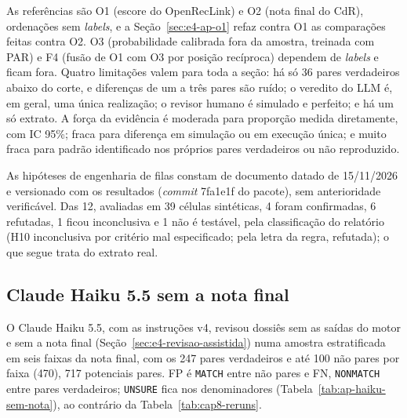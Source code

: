 As referências são O1 (escore do OpenRecLink) e O2 (nota final do CdR), ordenações sem \textit{labels}, e a Seção~\ref{sec:e4-ap-o1} refaz contra O1 as comparações feitas contra O2. O3 (probabilidade calibrada fora da amostra, treinada com PAR) e F4 (fusão de O1 com O3 por posição recíproca) dependem de \textit{labels} e ficam fora. Quatro limitações valem para toda a seção: há só 36 pares verdadeiros abaixo do corte, e diferenças de um a três pares são ruído; o veredito do LLM é, em geral, uma única realização; o revisor humano é simulado e perfeito; e há um só extrato. A força da evidência é moderada para proporção medida diretamente, com IC 95\%; fraca para diferença em simulação ou em execução única; e muito fraca para padrão identificado nos próprios pares verdadeiros ou não reproduzido.

As hipóteses de engenharia de filas constam de documento datado de 15/11/2026 e versionado com os resultados (\textit{commit} 7fa1e1f do pacote), sem anterioridade verificável. Das 12, avaliadas em 39 células sintéticas, 4 foram confirmadas, 6 refutadas, 1 ficou inconclusiva e 1 não é testável, pela classificação do relatório (H10 inconclusiva por critério mal especificado; pela letra da regra, refutada); o que segue trata do extrato real.

\subsection{Claude Haiku 5.5 sem a nota final}\label{sec:e4-ap-haiku-sem-nota}

O Claude Haiku 5.5, com as instruções v4, revisou dossiês sem as saídas do motor e sem a nota final (Seção~\ref{sec:e4-revisao-assistida}) numa amostra estratificada em seis faixas da nota final, com os 247 pares verdadeiros e até 100 não pares por faixa (470), 717 potenciais pares. FP é \texttt{MATCH} entre não pares e FN, \texttt{NONMATCH} entre pares verdadeiros; \texttt{UNSURE} fica nos denominadores (Tabela~\ref{tab:ap-haiku-sem-nota}), ao contrário da Tabela~\ref{tab:cap8-reruns}.


